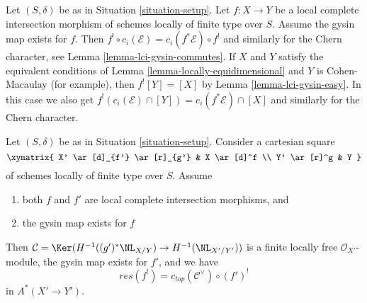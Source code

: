 \begin{remark}
\label{remark-gysin-chern-classes}
Let $(S, \delta)$ be as in Situation \ref{situation-setup}.
Let $f : X \to Y$ be a local complete intersection morphism
of schemes locally of finite type over $S$. Assume the gysin
map exists for $f$. Then
$f^! \circ c_i(\mathcal{E}) = c_i(f^*\mathcal{E}) \circ f^!$
and similarly for the Chern character, see
Lemma \ref{lemma-lci-gysin-commutes}.
If $X$ and $Y$ satisfy the equivalent conditions of
Lemma \ref{lemma-locally-equidimensional} and $Y$ is Cohen-Macaulay
(for example), then $f^![Y] = [X]$ by Lemma \ref{lemma-lci-gysin-easy}.
In this case we also get
$f^!(c_i(\mathcal{E}) \cap [Y]) = c_i(f^*\mathcal{E}) \cap [X]$
and similarly for the Chern character.
\end{remark}

\begin{lemma}
\label{lemma-compare-gysin-base-change}
Let $(S, \delta)$ be as in Situation \ref{situation-setup}.
Consider a cartesian square
$$
\xymatrix{
X' \ar[d]_{f'} \ar[r]_{g'} &
X \ar[d]^f \\
Y' \ar[r]^g &
Y
}
$$
of schemes locally of finite type over $S$. Assume
\begin{enumerate}
\item both $f$ and $f'$ are local complete intersection morphisms, and
\item the gysin map exists for $f$
\end{enumerate}
Then $\mathcal{C} = \Ker(H^{-1}((g')^*\NL_{X/Y}) \to H^{-1}(\NL_{X'/Y'}))$
is a finite locally free $\mathcal{O}_{X'}$-module, the gysin map
exists for $f'$, and we have
$$
res(f^!) = c_{top}(\mathcal{C}^\vee) \circ (f')^!
$$
in $A^*(X' \to Y')$.
\end{lemma}


